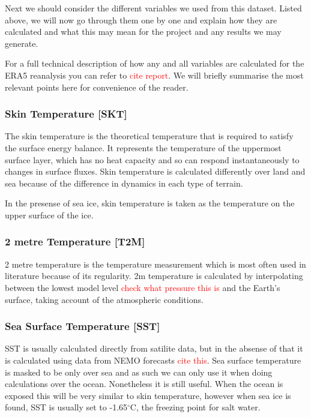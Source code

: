 \documentclass[../main.tex]{subfiles}
\begin{document}
Next we should consider the different variables we used from this dataset. Listed above, we will now go through them one by one and explain how they are calculated and what this may mean for the project and any results we may generate.

For a full technical description of how any and all variables are calculated for the ERA5 reanalysis you can refer to \textcolor{red}{cite report}. We will briefly summarise the most relevant points here for convenience of the reader.

\subsubsection*{Skin Temperature [SKT]}

The skin temperature is the theoretical temperature that is required to satisfy the surface energy balance. It represents the temperature of the uppermost surface layer, which has no heat capacity and so can respond instantaneously to changes in surface fluxes. Skin temperature is calculated differently over land and sea because of the difference in dynamics in each type of terrain.

In the presense of sea ice, skin temperature is taken as the temperature on the upper surface of the ice.

\subsubsection*{2 metre Temperature [T2M]}

2 metre temperature is the temperature measurement which is most often used in literature because of its regularity. 2m temperature is calculated by interpolating between the lowest model level \textcolor{red}{check what pressure this is} and the Earth's surface, taking account of the atmospheric conditions.

\subsubsection*{Sea Surface Temperature [SST]}

SST is usually calculated directly from satilite data, but in the absense of that it is calculated using data from NEMO forecasts 
\textcolor{red}{cite this}.
Sea surface temperature is masked to be only over sea and as such we can only use it when doing calculations over the ocean. Nonetheless it is still useful.
When the ocean is exposed this will be very similar to skin temperature, however when sea ice is found, SST is usually set to -1.65$^\circ$C, the freezing point for salt water. 
\end{document}
